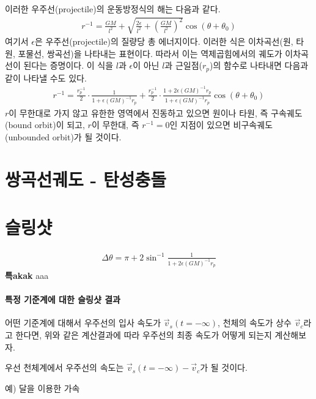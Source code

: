 \documentclass[9pt]{amsbook}
\begin{document}
이러한 우주선(projectile)의 운동방정식의 해는 다음과 같다.
\begin{align}
	r^{-1} = \frac{GM}{l^2} + \sqrt{\frac{2\epsilon}{l^2}+\left(\frac{GM}{l^2}\right)^2}\cos(\theta+\theta_0)
\end{align}
여기서 $\epsilon$은 우주선(projectile)의 질량당 총 에너지이다. 이러한 식은 이차곡선(원, 타원, 포물선, 쌍곡선)을 나타내는 표현이다. 따라서 이는 역제곱힘에서의 궤도가 이차곡선이 된다는 증명이다.
이 식을 $l$과 $\epsilon$이 아닌 $l$과 근일점($r_p$)의 함수로 나타내면 다음과 같이 나타낼 수도 있다.
\begin{align}
	r^{-1} = \frac{r_p^{-1}}{2}\cdot\frac{1}{1+\epsilon (GM)^{-1}r_p} +\frac{r_p^{-1}}{2}\cdot\frac{1+2\epsilon (GM)^{-1}r_p}{1+\epsilon (GM)^{-1}r_p}\cos(\theta+\theta_0)
\end{align}
$r$이 무한대로 가지 않고 유한한 영역에서 진동하고 있으면 원이나 타원, 즉 구속궤도(bound orbit)이 되고, $r$이 무한대, 즉 $r^{-1}=0$인 지점이 있으면 비구속궤도(unbounded orbit)가 될 것이다.

\section{쌍곡선궤도 - 탄성충돌}
\section{슬링샷}

\begin{align}
	\Delta \theta = \pi + 2\sin^{-1}\frac{1}{{1+2\epsilon (GM)^{-1}r_p}}
\end{align}
\textbf{\textsf{\large 특akak}}\;\; aaa
\paragraph{특정 기준계에 대한 슬링샷 결과}
어떤 기준계에 대해서 우주선의 입사 속도가 $\vec{v}_s(t=-\infty)$, 천체의 속도가 상수 $\vec{v}_c$라고 한다면, 위와 같은 계산결과에 따라 우주선의 최종 속도가 어떻게 되는지 계산해보자.

우선 천체계에서 우주선의 속도는 $\vec{v}_s(t=-\infty)-\vec{v}_c$가 될 것이다.

예) 달을 이용한 가속
\end{document}
